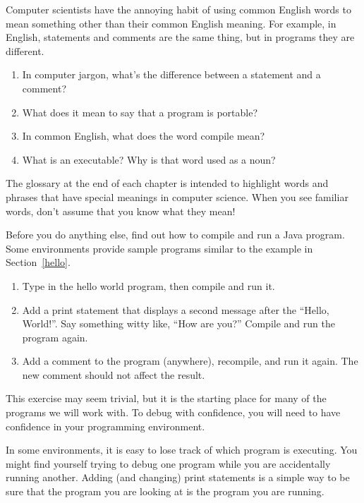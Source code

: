 \begin{exercise}  %

Computer scientists have the annoying habit of using common English words to mean something other than their common English meaning.
For example, in English, statements and comments are the same thing, but in programs they are different.

\begin{enumerate}
\item In computer jargon, what's the difference between a statement and a comment?
\item What does it mean to say that a program is portable?
\item In common English, what does the word compile mean?
\item What is an executable? Why is that word used as a noun?
\end{enumerate}

The glossary at the end of each chapter is intended to highlight words and phrases that have special meanings in computer science.
When you see familiar words, don't assume that you know what they mean!

\end{exercise}


\begin{exercise}  %

Before you do anything else, find out how to compile and run a Java program.
Some environments provide sample programs similar to the example in Section~\ref{hello}.

\begin{enumerate}
\item Type in the hello world program, then compile and run it.

\item Add a print statement that displays a second message after the ``Hello, World!''.
Say something witty like, ``How are you?''
Compile and run the program again.

\item Add a comment to the program (anywhere), recompile, and run it again.
The new comment should not affect the result.
\end{enumerate}

This exercise may seem trivial, but it is the starting place for many of the programs we will work with.
To debug with confidence, you will need to have confidence in your programming environment.

In some environments, it is easy to lose track of which program is executing.
You might find yourself trying to debug one program while you are accidentally running another.
Adding (and changing) print statements is a simple way to be sure that the program you are looking at is the program you are running.

\end{exercise}


